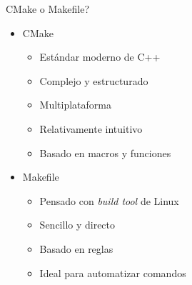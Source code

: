\documentclass{beamer}
\begin{document}
\begin{frame}[fragile]{CMake o Makefile?}
    \begin{itemize}
        \item CMake
        \begin{itemize}
            \item Estándar moderno de C++
            \item Complejo y estructurado
            \item Multiplataforma
            \item Relativamente intuitivo
            \item Basado en macros y funciones
        \end{itemize}
        \item Makefile
        \begin{itemize}
            \item Pensado con \emph{build tool} de Linux
            \item Sencillo y directo
            \item Basado en reglas
            \item Ideal para automatizar comandos
        \end{itemize}
    \end{itemize}
\end{frame}
\end{document}
